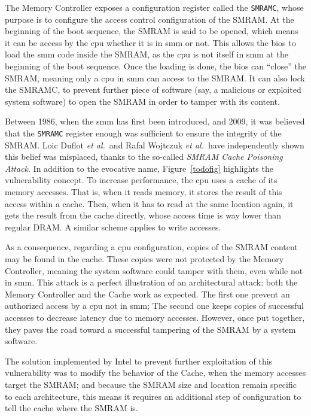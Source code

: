The Memory Controller exposes a configuration register called the
\texttt{SMRAMC}, whose purpose is to configure the access control configuration
of the SMRAM.
%
At the beginning of the boot sequence, the SMRAM is said to be opened, which
means it can be access by the \ac{cpu} whether it is in \ac{smm} or not.
%
This allows the \ac{bios} to load the \ac{smm} code inside the SMRAM, as the
\ac{cpu} is not itself in \ac{smm} at the beginning of the boot sequence.
%
Once the loading is done, the \ac{bios} can ``close'' the SMRAM, meaning only a
\ac{cpu} in \ac{smm} can access to the SMRAM.
%
It can also lock the SMRAMC, to prevent further piece of software (say, a
malicious or exploited system software) to open the SMRAM in order to tamper
with its content.

Between 1986, when the \ac{smm} has first been
introduced, and 2009, it was believed that the \texttt{SMRAMC} register enough
was sufficient to ensure the integrity of the SMRAM.
%
Loic Duflot \emph{et al.}\,\cite{duflot2009smram} and Rafal Wojtczuk \emph{et
  al.}\,\cite{wojtczuk2009smram} have independently shown this belief was
misplaced, thanks to the so-called \emph{SMRAM Cache Poisoning Attack}.
%
In addition to the evocative name, Figure~\ref{todofig} highlights the
vulnerability concept.
%
To increase performance, the \ac{cpu} uses a cache of its memory accesses.
%
That is, when it reads memory, it stores the result of this access within a
cache.
%
Then, when it has to read at the same location again, it gets the result from
the cache directly, whose access time is way lower than regular DRAM.
%
A similar scheme applies to write accesses.

As a consequence, regarding a \ac{cpu} configuration, copies of the SMRAM
content may be found in the cache.
%
These copies were not protected by the Memory Controller, meaning the system
software could tamper with them, even while not in \ac{smm}.
%
This attack is a perfect illustration of an architectural attack:
%
both the Memory Controller and the Cache work as expected.
%
The first one prevent an authorized access by a \ac{cpu} not in \ac{smm};
%
The second one keeps copies of successful accesses to decrease latency due to
memory accesses.
%
However, once put together, they paves the road toward a successful tampering of
the SMRAM by a system software.

The solution implemented by Intel to prevent further exploitation of this
vulnerability was to modify the behavior of the Cache, when the memory accesses
target the SMRAM;
%
and because the SMRAM size and location remain specific to each architecture,
this means it requires an additional step of configuration to tell the cache
where the SMRAM is.

